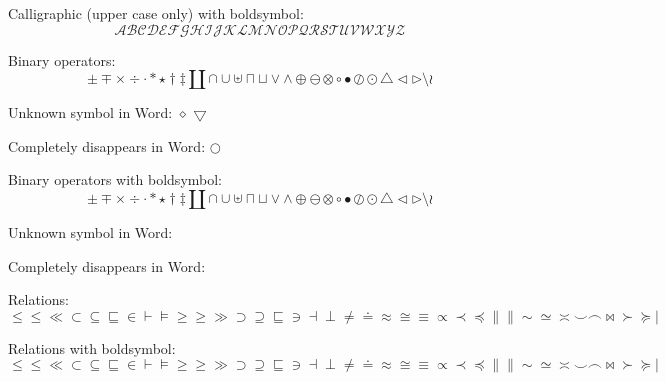 \documentclass[12pt,a4paper]{article}
\theoremstyle{clearprint}
\begin{document}
Calligraphic (upper case only) with boldsymbol:
\begin{equation}
\boldsymbol{\mathcal{A}  \mathcal{B}  \mathcal{C}  \mathcal{D}  \mathcal{E}  \mathcal{F}  \mathcal{G}  \mathcal{H}  \mathcal{I}  \mathcal{J}  \mathcal{K}  \mathcal{L}  \mathcal{M}  \mathcal{N}  \mathcal{O}  \mathcal{P}  \mathcal{Q}  \mathcal{R}  \mathcal{S}  \mathcal{T}  \mathcal{U}  \mathcal{V}  \mathcal{W}  \mathcal{X}  \mathcal{Y}  \mathcal{Z}}
\end{equation}

\noindent 
Binary operators:
\begin{equation}
\pm \mp \times \div \cdot \ast \star \dagger \ddagger \amalg \cap \cup \uplus \sqcap \sqcup \vee \wedge \oplus \ominus \otimes \circ \bullet \oslash \odot  \bigtriangleup  \triangleleft \triangleright \setminus \wr
\end{equation}

Unknown symbol in Word: $\diamond$ $\bigtriangledown$

Completely disappears in Word: $\bigcirc$

\noindent 
Binary operators with boldsymbol:
\begin{equation}
\boldsymbol{\pm \mp \times \div \cdot \ast \star \dagger \ddagger \amalg \cap \cup \uplus \sqcap \sqcup \vee \wedge \oplus \ominus \otimes \circ \bullet \oslash \odot  \bigtriangleup  \triangleleft \triangleright \setminus \wr}
\end{equation}

Unknown symbol in Word: \boldsymbol{$\diamond$ $\bigtriangledown$}

Completely disappears in Word: \boldsymbol{$\bigcirc$}

\noindent 
Relations:
\begin{equation}
\le \leq \ll \subset \subseteq \sqsubseteq \in \vdash \models \ge \geq \gg \supset \supseteq \sqsubseteq \ni \dashv \perp \neq \doteq \approx \cong \equiv \propto \prec \preceq \parallel \| \sim \simeq \asymp \smile \frown \bowtie \succ \succeq \mid
\end{equation}

\noindent 
Relations with boldsymbol:
\begin{equation}
\boldsymbol{\le \leq \ll \subset \subseteq \sqsubseteq \in \vdash \models \ge \geq \gg \supset \supseteq \sqsubseteq \ni \dashv \perp \neq} \boldsymbol{\doteq \approx \cong \equiv \propto \prec \preceq \parallel \| \sim \simeq \asymp \smile \frown \bowtie \succ \succeq \mid}
\end{equation}
\end{document}

